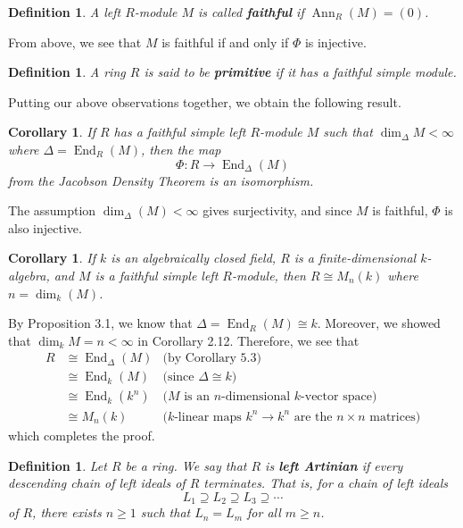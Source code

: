 \documentclass[10pt]{article}
\makeatletter
\numberwithin{equation}{section}
\DeclareMathOperator{\End}{End}
\DeclareMathOperator{\Ann}{Ann}
\theoremstyle{newstyle}
\newtheorem{cor}[thm]{Corollary}
\newtheorem{defn}[thm]{Definition}
\newenvironment{pf}[1][\proofname]{\par
  \pushQED{\qed}%
  \normalfont \topsep0\p@\relax
  \trivlist
  \item[\hskip\labelsep\scshape
  #1\@addpunct{.}]\ignorespaces
}{%
  \popQED\endtrivlist\@endpefalse
}
\makeatother
\begin{document}
\begin{defn}
A left $R$-module $M$ is called {\bf faithful} if $\Ann_R(M) = (0)$. 
\end{defn}

From above, we see that $M$ is faithful if and only if $\Phi$ is injective. 

\begin{defn}
A ring $R$ is said to be {\bf primitive} if it has a faithful simple module.
\end{defn}

Putting our above observations together, we obtain the following result. 

\begin{cor}
If $R$ has a faithful simple left $R$-module $M$ such that $\dim_\Delta M < \infty$ where 
$\Delta = \End_R(M)$, then the map 
\[ \Phi : R \to \End_\Delta(M) \]
from the Jacobson Density Theorem is an isomorphism. 
\end{cor}
\begin{pf}
The assumption $\dim_\Delta(M) < \infty$ gives surjectivity, and since $M$ is faithful, 
$\Phi$ is also injective.
\end{pf}

\begin{cor}
If $k$ is an algebraically closed field, $R$ is a finite-dimensional $k$-algebra, and $M$ is a 
faithful simple left $R$-module, then $R \cong M_n(k)$ where $n = \dim_k(M)$. 
\end{cor}
\begin{pf}
By Proposition 3.1, we know that $\Delta = \End_R(M) \cong k$. Moreover, we showed that 
$\dim_k M = n < \infty$ in Corollary 2.12. Therefore, we see that 
\begin{align*}
    R &\cong \End_\Delta(M) & \text{(by Corollary 5.3)} \\
    &\cong \End_k(M) & \text{(since $\Delta \cong k$)} \\
    &\cong \End_k(k^n) & \text{($M$ is an $n$-dimensional $k$-vector space)} \\
    &\cong M_n(k) & \text{($k$-linear maps $k^n \to k^n$ are the $n \times n$ matrices)} 
\end{align*}
which completes the proof.
\end{pf}

\begin{defn}
Let $R$ be a ring. We say that $R$ is {\bf left Artinian} if every descending chain of left ideals of $R$
terminates. That is, for a chain of left ideals 
\[ L_1 \supseteq L_2 \supseteq L_3 \supseteq \cdots \]
of $R$, there exists $n \geq 1$ such that $L_n = L_m$ for all $m \geq n$. 
\end{defn}
\end{document}
